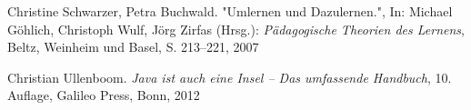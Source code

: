 \begin{thebibliography}{ABCDEF}

Christine Schwarzer, Petra Buchwald. "{Umlernen und Dazulernen}.", In: Michael Göhlich, Christoph Wulf, Jörg Zirfas (Hrsg.): \emph{Pädagogische Theorien des Lernens}, Beltz, Weinheim und Basel,  S. 213--221, 2007




Christian Ullenboom. \emph{Java ist auch eine Insel -- Das umfassende Handbuch}, 10. Auflage, Galileo Press, Bonn, 2012


\end{thebibliography}